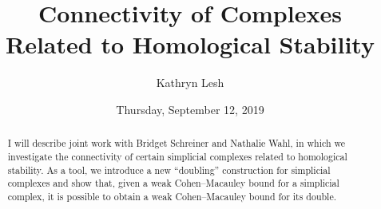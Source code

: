 \documentclass{UAmathtalk}
\author{Kathryn Lesh}
\title{Connectivity of Complexes\\ Related to Homological Stability}
\date{Thursday, September 12, 2019}
\begin{document}
\maketitle

\begin{abstract}
I will describe joint work with Bridget Schreiner and Nathalie Wahl, in which we investigate the connectivity of certain simplicial complexes related to homological stability. As a tool, we introduce a new ``doubling'' construction for simplicial complexes and show that, given a weak Cohen--Macauley bound for a simplicial complex, it is possible to obtain a weak Cohen--Macauley bound for its double.
\end{abstract}
\end{document}

